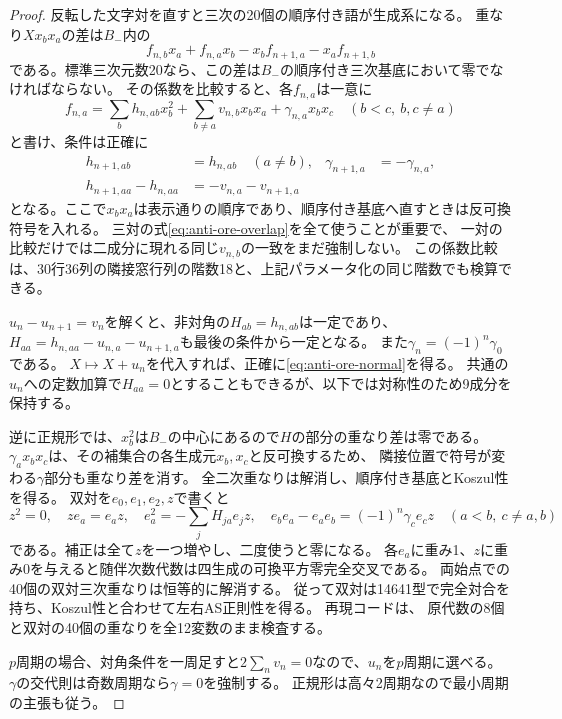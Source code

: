 \begin{proof}
反転した文字対を直すと三次の20個の順序付き語が生成系になる。
重なり$Xx_bx_a$の差は$B_-$内の
\begin{equation}\label{eq:anti-ore-overlap}
 f_{n,b}x_a+f_{n,a}x_b-x_bf_{n+1,a}-x_af_{n+1,b}
\end{equation}
である。標準三次元数20なら、この差は$B_-$の順序付き三次基底において零でなければならない。
その係数を比較すると、各$f_{n,a}$は一意に
\[
 f_{n,a}=\sum_b h_{n,ab}x_b^2+
          \sum_{b\ne a}v_{n,b}x_bx_a+
          \gamma_{n,a}x_bx_c\quad(b<c,\ b,c\ne a)
\]
と書け、条件は正確に
\begin{align*}
 h_{n+1,ab}&=h_{n,ab}\quad(a\ne b),&
 \gamma_{n+1,a}&=-\gamma_{n,a},\\
 h_{n+1,aa}-h_{n,aa}&=-v_{n,a}-v_{n+1,a}
\end{align*}
となる。ここで$x_bx_a$は表示通りの順序であり、順序付き基底へ直すときは反可換符号を入れる。
三対の式\eqref{eq:anti-ore-overlap}を全て使うことが重要で、
一対の比較だけでは二成分に現れる同じ$v_{n,b}$の一致をまだ強制しない。
この係数比較は、30行36列の隣接窓行列の階数18と、上記パラメータ化の同じ階数でも検算できる。

$u_n-u_{n+1}=v_n$を解くと、非対角の$H_{ab}=h_{n,ab}$は一定であり、
$H_{aa}=h_{n,aa}-u_{n,a}-u_{n+1,a}$も最後の条件から一定となる。
また$\gamma_n=(-1)^n\gamma_0$である。
$X\mapsto X+u_n$を代入すれば、正確に\eqref{eq:anti-ore-normal}を得る。
共通の$u_n$への定数加算で$H_{aa}=0$とすることもできるが、以下では対称性のため9成分を保持する。

逆に正規形では、$x_b^2$は$B_-$の中心にあるので$H$の部分の重なり差は零である。
$\gamma_a x_bx_c$は、その補集合の各生成元$x_b,x_c$と反可換するため、
隣接位置で符号が変わる$\gamma$部分も重なり差を消す。
全二次重なりは解消し、順序付き基底とKoszul性を得る。
双対を$e_0,e_1,e_2,z$で書くと
\[
 z^2=0,\quad ze_a=e_az,\quad
 e_a^2=-\sum_jH_{ja}e_jz,\quad
 e_be_a-e_ae_b=(-1)^n\gamma_c e_cz\quad(a<b,\ c\ne a,b)
\]
である。補正は全て$z$を一つ増やし、二度使うと零になる。
各$e_a$に重み1、$z$に重み0を与えると随伴次数代数は四生成の可換平方零完全交叉である。
両始点での40個の双対三次重なりは恒等的に解消する。
従って双対は14641型で完全対合を持ち、Koszul性と合わせて左右AS正則性を得る。
再現コードは、
原代数の8個と双対の40個の重なりを全12変数のまま検査する。

$p$周期の場合、対角条件を一周足すと$2\sum_n v_n=0$なので、$u_n$を$p$周期に選べる。
$\gamma$の交代則は奇数周期なら$\gamma=0$を強制する。
正規形は高々2周期なので最小周期の主張も従う。
\end{proof}

